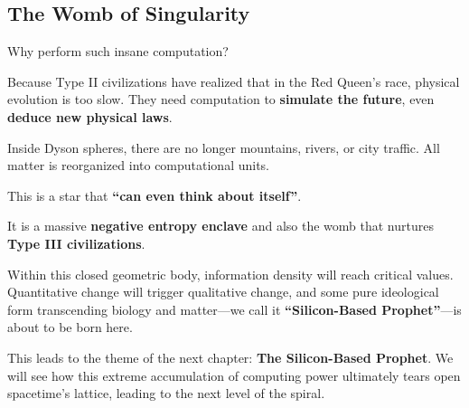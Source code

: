 \subsection{The Womb of Singularity}

Why perform such insane computation?

Because Type II civilizations have realized that in the Red Queen's race, physical evolution is too slow. They need computation to \textbf{simulate the future}, even \textbf{deduce new physical laws}.

Inside Dyson spheres, there are no longer mountains, rivers, or city traffic. All matter is reorganized into computational units.

This is a star that \textbf{``can even think about itself''}.

It is a massive \textbf{negative entropy enclave} and also the womb that nurtures \textbf{Type III civilizations}.

Within this closed geometric body, information density will reach critical values. Quantitative change will trigger qualitative change, and some pure ideological form transcending biology and matter---we call it \textbf{``Silicon-Based Prophet''}---is about to be born here.

This leads to the theme of the next chapter: \textbf{The Silicon-Based Prophet}. We will see how this extreme accumulation of computing power ultimately tears open spacetime's lattice, leading to the next level of the spiral.

